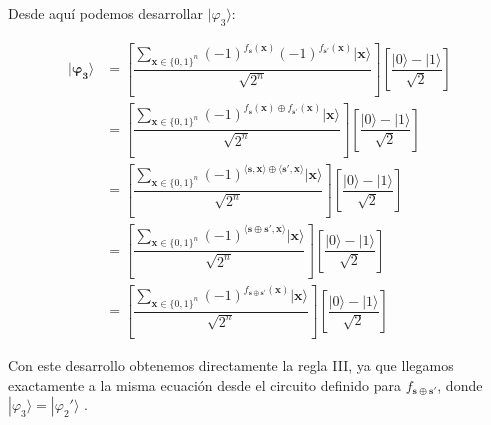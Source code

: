  \newpage

 Desde aquí podemos desarrollar $|\varphi_{3}\rangle$:

 \begin{equation}
    \begin{split}
     \mathbf{|\varphi_{3}\rangle} &= \left[ \dfrac{\sum_{\mathbf{x} \in \{0,1\}^{n}}(-1)^{f_{\mathbf{s}}(\mathbf{x})}(-1)^{f_{\mathbf{s}'}(\mathbf{x})}|\mathbf{x}\rangle}{\sqrt{2^{n}}}\right] \left[ \dfrac{|0\rangle - |1\rangle}{\sqrt{2}}\right] \\ &= \left[ \dfrac{\sum_{\mathbf{x} \in \{0,1\}^{n}}(-1)^{f_{\mathbf{s}}(\mathbf{x})\oplus f_{\mathbf{s}'}(\mathbf{x})}|\mathbf{x}\rangle}{\sqrt{2^{n}}}\right] \left[ \dfrac{|0\rangle - |1\rangle}{\sqrt{2}}\right] \\ &= \left[ \dfrac{\sum_{\mathbf{x} \in \{0,1\}^{n}}(-1)^{\langle\mathbf{s},\mathbf{x}\rangle\oplus \langle\mathbf{s}',\mathbf{x}\rangle}|\mathbf{x}\rangle}{\sqrt{2^{n}}}\right] \left[ \dfrac{|0\rangle - |1\rangle}{\sqrt{2}}\right] \\ &= \left[ \dfrac{\sum_{\mathbf{x} \in \{0,1\}^{n}}(-1)^{\langle\mathbf{s}\oplus\mathbf{s}',\mathbf{x}\rangle}|\mathbf{x}\rangle}{\sqrt{2^{n}}}\right] \left[ \dfrac{|0\rangle - |1\rangle}{\sqrt{2}}\right] \\ &= \left[ \dfrac{\sum_{\mathbf{x} \in \{0,1\}^{n}}(-1)^{f_{\mathbf{s}\oplus\mathbf{s}'}(\mathbf{x})}|\mathbf{x}\rangle}{\sqrt{2^{n}}}\right] \left[ \dfrac{|0\rangle - |1\rangle}{\sqrt{2}}\right]
     \end{split}
 \end{equation}\newline

 Con este desarrollo obtenemos directamente la regla III, ya que llegamos exactamente a la misma ecuación desde el circuito definido para $f_{\mathbf{s}\oplus\mathbf{s}'}$, donde $|\varphi_{3}\rangle=|\varphi_{2}'\rangle$ .

 \vspace{20pt}


